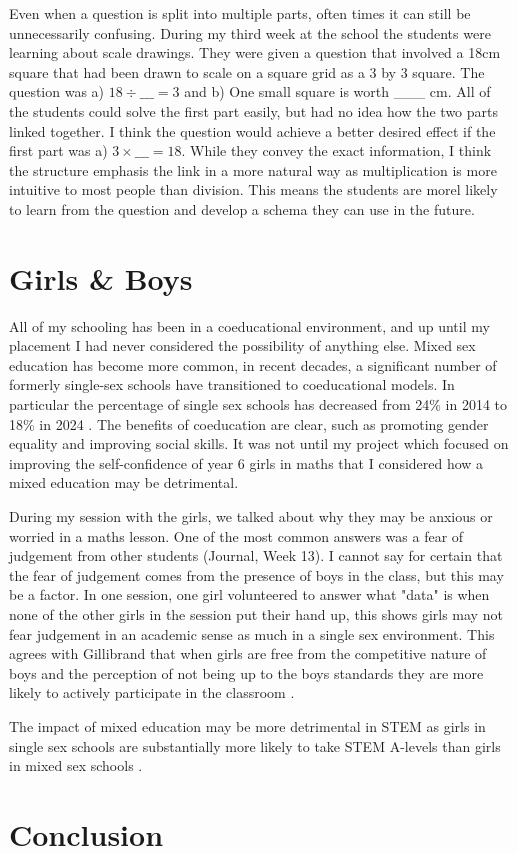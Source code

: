 \documentclass[11pt, a4paper, notitlepage]{article}
\begin{document}
\par
Even when a question is split into multiple parts, often times it can still be unnecessarily confusing. During my third week at the school the students were learning about scale drawings. They were given a question that involved a 18cm square that had been drawn to scale on a square grid as a 3 by 3 square. The question was a) $18 \div \_\_\_= 3$ and b) One small square is worth \_\_\_ cm. All of the students could solve the first part easily, but had no idea how the two parts linked together. I think the question would achieve a better desired effect if the first part was a) $3\times\_\_\_ = 18$. While they convey the exact information, I think the structure emphasis the link in a more natural way as multiplication is more intuitive to most people than division. This means the students are morel likely to learn from the question and develop a schema they can use in the future.

\section*{Girls \& Boys}
All of my schooling has been in a coeducational environment, and up until my placement I had never considered the possibility of anything else. Mixed sex education has become more common, in recent decades, a significant number of formerly single-sex schools have transitioned to coeducational models. In particular the percentage of single sex schools has decreased from 24\% in 2014 to 18\% in 2024 \cite{ICS:2014} \cite{ICS:2024}. The benefits of coeducation are clear, such as promoting gender equality and improving social skills. It was not until my project which focused on improving the self-confidence of year 6 girls in maths that I considered how a mixed education may be detrimental.
\par
During my session with the girls, we talked about why they may be anxious or worried in a maths lesson. One of the most common answers was a fear of judgement from other students (Journal, Week 13). I cannot say for certain that the fear of judgement comes from the presence of boys in the class, but this may be a factor. In one session, one girl volunteered to answer what "data" is when none of the other girls in the session put their hand up, this shows girls may not fear judgement in an academic sense as much in a single sex environment. This agrees with Gillibrand that when girls are free from the competitive nature of boys and the perception of not being up to the boys standards they are more likely to actively participate in the classroom \cite{Gillibrand:1999}.
\par
The impact of mixed education may be more detrimental in STEM as girls in single sex schools are substantially more likely to take STEM A-levels than girls in mixed sex schools \cite{Anders:2022}.



\section*{Conclusion}



\end{document}
